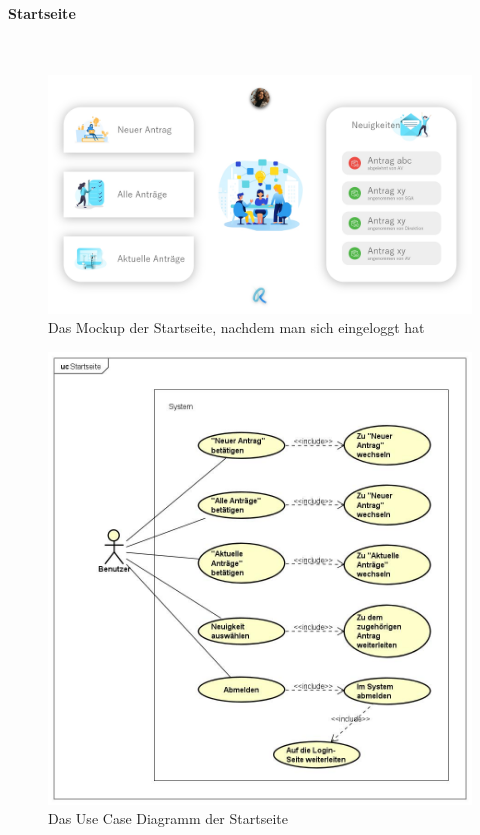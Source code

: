 \paragraph{Startseite}
~\\

\begin{figure}[H]
	\centering
	\includegraphics[width=1\linewidth]{images/Mockup-Startseite-eingeloggt}
	\caption[Mockup Startseite]{Das Mockup der Startseite, nachdem man sich eingeloggt hat}
	\label{fig:mockupStart}
\end{figure}
\begin{figure}[H]
	\centering
	\includegraphics[width=1\linewidth]{images/uc-start}
	\caption[Use Case Diagramm Login]{Das Use Case Diagramm der Startseite}
	\label{fig:ucStart}
\end{figure}
